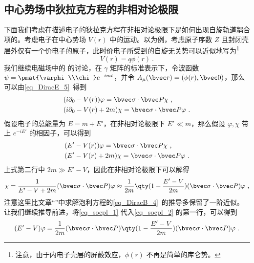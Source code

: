 \subsection{中心势场中狄拉克方程的非相对论极限}
\cite{曾谨言}下面我们考虑在描述电子的狄拉克方程在非相对论极限下是如何出现自旋轨道耦合项的。考虑电子在中心势场 $V(r)$ 中的运动。以为例，考虑原子序数 $Z$ 且封闭壳层外仅有一个价电子的原子，此时价电子所受到的自旋无关势可以近似地写为\footnote{注意，由于内电子壳层的屏蔽效应，$\phi(r)$ 不再是简单的库仑势。}
\begin{equation}
V(r)=q\phi(r)~.
\end{equation}
我们继续电磁场中的 的讨论，在 $\gamma$ 矩阵的标准表示下，令波函数 $\psi=\pmat{\varphi\\\chi}e^{-imt}$，并令 $A_\mu(\bvec r)=(\phi(r),\bvec 0)$，那么可以由\autoref{eq_DiracE_5}~得到
\begin{equation}
\begin{aligned}
&(i\partial_0 - V(r))\varphi = \bvec \sigma\cdot \bvec P \chi~,\\
&(i\partial_0 - V(r) + 2m) \chi = \bvec \sigma\cdot \bvec P  \varphi~.
\end{aligned}
\end{equation}
假设电子的总能量为 $E=m+E'$，在非相对论极限下 $E'\ll m$，那么假设 $\varphi,\chi$ 带上 $e^{-iE'}$ 的相因子，可以得到
\begin{equation}\label{eq_socpl_2}
\begin{aligned}
&(E' - V(r))\varphi = \bvec \sigma\cdot \bvec P \chi~,\\
&(E' - V(r) + 2m) \chi = \bvec \sigma\cdot \bvec P  \varphi~.
\end{aligned}
\end{equation}
上式第二行中 $2m\gg E'-V$，因此在非相对论极限下可以解得
\begin{equation}\label{eq_socpl_1}
\chi = \frac{1}{E'-V+2m}(\bvec \sigma\cdot \bvec P)\varphi
\approx\frac{1}{2m}\qty(1-\frac{E'-V}{2m})(\bvec \sigma\cdot \bvec P) \varphi~,
\end{equation}
注意这里比文章“”中求解泡利方程的\autoref{eq_DiracB_4}~的推导多保留了一阶近似。让我们继续推导前进，将\autoref{eq_socpl_1} 代入\autoref{eq_socpl_2} 的第一行，可以得到
\begin{equation}
(E'-V)\varphi = \frac{1}{2m}(\bvec \sigma\cdot \bvec P)\qty(1-\frac{E'-V}{2m})(\bvec \sigma\cdot \bvec P)\varphi~.
\end{equation}
